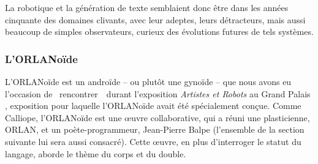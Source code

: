 \documentclass{article}
\begin{document}
					La robotique et la génération de texte semblaient donc être dans les années cinquante des domaines clivants, avec leur adeptes, leurs détracteurs, mais aussi beaucoup de simples observateurs, curieux des évolutions futures de tels systèmes.
			\subsubsection{L'ORLANoïde}
				L'ORLANoïde est un androïde -- ou plutôt une gynoïde -- que nous avons eu l'occasion de \guillemotleft~rencontrer~\guillemotright~durant l'exposition \textit{Artistes et Robots} au Grand Palais \autocite{artistes_robots}, exposition pour laquelle l'ORLANoïde avait été spécialement conçue. Comme Calliope, l'ORLANoïde est une œuvre collaborative, qui a réuni une plasticienne, ORLAN, et un poète-programmeur, Jean-Pierre Balpe (l'ensemble de la section suivante lui sera aussi consacré). Cette œuvre, en plus d'interroger le statut du langage, aborde le thème du corps et du double.\\
				
\end{document}
